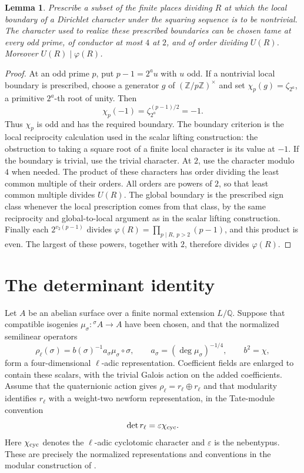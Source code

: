 \documentclass[11pt,a4paper]{article}
\newtheorem{lemma}[theorem]{Lemma}
\theoremstyle{definition}\newtheorem{remark}[theorem]{Remark}
\newcommand{\Q}{\mathbb Q}\newcommand{\Z}{\mathbb Z}
\begin{document}
\begin{lemma}\label{lem:characters}
Prescribe a subset of the finite places dividing $R$ at which the
local boundary of a Dirichlet character under the squaring sequence is
to be nontrivial. The character used to realize these prescribed
boundaries can be chosen tame at every odd prime, of conductor at most
$4$ at $2$, and of order dividing $U(R)$. Moreover $U(R)\mid\varphi(R)$.
\end{lemma}
\begin{proof}
At an odd prime $p$, put $p-1=2^a u$ with $u$ odd. If a nontrivial
local boundary is prescribed, choose a generator $g$ of
$(\Z/p\Z)^\times$ and set $\chi_p(g)=\zeta_{2^a}$, a primitive
$2^a$-th root of unity. Then
\[
 \chi_p(-1)=\zeta_{2^a}^{(p-1)/2}=-1.
\]
Thus $\chi_p$ is odd and has the required boundary. The boundary
criterion is the local reciprocity calculation used in the scalar
lifting construction: the obstruction to taking a square root of a
finite local character is its value at $-1$. If the boundary is
trivial, use the trivial character. At $2$, use the character modulo
$4$ when needed. The product of these characters has order dividing
the least common multiple of their orders. All orders are powers of
$2$, so that least common multiple divides $U(R)$. The global boundary
is the prescribed sign class whenever the local prescription comes
from that class, by the same reciprocity and global-to-local argument
as in the scalar lifting construction. Finally each $2^{v_2(p-1)}$
divides $\varphi(R)=\prod_{p\mid R,\ p>2}(p-1)$, and this product is
even. The largest of these powers, together with $2$, therefore divides
$\varphi(R)$.
\end{proof}

\section{The determinant identity}

Let $A$ be an abelian surface over a finite normal extension $L/\Q$.
Suppose that compatible isogenies
$\mu_\sigma:{}^\sigma A\to A$ have been chosen, and that the normalized
semilinear operators
\begin{equation}\label{eq:normalized}
 \rho_\ell(\sigma)=b(\sigma)^{-1}a_\sigma\mu_\sigma\circ\sigma,
 \qquad a_\sigma=(\deg\mu_\sigma)^{-1/4},\qquad b^2=\chi,
\end{equation}
form a four-dimensional $\ell$-adic representation. Coefficient fields
are enlarged to contain these scalars, with the trivial Galois action
on the added coefficients. Assume that the quaternionic action gives
$\rho_\ell=r_\ell\oplus r_\ell$ and that modularity identifies
$r_\ell$ with a weight-two newform representation, in the Tate-module
convention
\[
                         \det r_\ell=\varepsilon\chi_{\rm cyc}.
\]
Here $\chi_{\rm cyc}$ denotes the $\ell$-adic cyclotomic character and
$\varepsilon$ is the nebentypus. These are precisely the normalized
representations and conventions in the modular construction of
\cite[proof of \texttt{o8-height}, (LR2)--(LR5)]{Source}.
\end{document}
